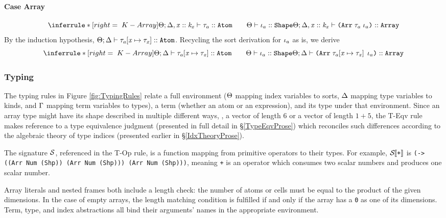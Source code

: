 \begin{sproof}
  \paragraph{Case {\sc Array}}
  \[\infr[K-Array]
  {\kindof{\sEnv}{\kEnv, \haskind{\var}{\kind_\var}}{\type_a}{\kindatom}
    \qquad \sortof{\sEnv}{\idx_a}{\sortshp}}
  {\kindof{\sEnv}{\kEnv, \haskind{\var}{\kind_\var}}{\typearray{\type_a}{\idx_a}}{\kindarray}}\]
  By the induction hypothesis,
  $\Theta;\Delta \vdash \mathit{\tau}_a\hspace{-2pt}\left[ \mathit{x} \mapsto \mathit{\tau}_{\mathit{x}} \right] :: \text{\tt Atom}$.
  Recycling the sort derivation for $\mathit{\iota}_a$ as is, we derive
  \[\infr[K-Array]
  {\kindof{\sEnv}{\kEnv}{\typesubst{\type_a}}{\kindatom}
    \qquad \sortof{\sEnv}{\idx_a}{\sortshp}}
  {\kindof{\sEnv}{\kEnv}{\typearray{\typesubst{\type_a}}{\idx_a}}{\kindarray}}\]
\end{sproof}

\subsubsection{Typing}
\FigTypingRules

The typing rules in Figure \ref{fig:TypingRules} relate
a full environment
($\Theta$ mapping index variables to sorts,
$\Delta$ mapping type variables to kinds,
and $\Gamma$ mapping term variables to types),
a term (whether an atom or an expression),
and its type under that environment.
Since an array type might have its shape described in multiple different ways,
\eg, a vector of length 6 or a vector of length $1+5$,
the {\sc T-Eqv} rule makes reference to a type equivalence judgment
(presented in full detail in \S\ref{TypeEqvProse})
which reconciles such differences according to
the algebraic theory of type indices
(presented earlier in \S\ref{IdxTheoryProse}).

The signature $\mathcal{S}$,
referenced in the {\sc T-Op} rule,
is a function mapping from primitive operators to their types.
For example, $\mathcal{S}{\hskip-.25em}\left\llbracket\text{\tt +}\right\rrbracket$ is
{\tt (-> ((Arr Num (Shp)) (Arr Num (Shp))) (Arr Num (Shp)))},
meaning {\tt +} is an operator
which consumes two scalar numbers
and produces one scalar number.

Array literals and nested frames both include a length check:
the number of atoms or cells must be equal to
the product of the given dimensions.
In the case of empty arrays, the length matching condition is fulfilled
if and only if the array has a {\tt 0} as one of its dimensions.
Term, type, and index abstractions all
bind their arguments' names in the appropriate environment.

